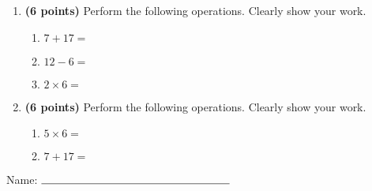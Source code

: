 \documentclass[12pt]{amsart}
\begin{document}
\newpage
\begin{enumerate}
\item {\bf (6 points)} 
 Perform the following operations. Clearly show your work. \begin{enumerate}


\def \a{7}\def \b{17}\def \apb{24}

 
\item $\a + \b = $

\vspace{2cm}
\def \a{12}\def \dif{6}\def \b{6}

 
\item $\a - \b = $

\vspace{2cm}
\def \a{2}\def \b{6}\def \ab{8}

 
\item $\a \times \b = $ 

\vspace{2cm}
\def \vshift{-3}\def \hshift{-4}\def \chang{0}\def \findval{-4}\def \yval{-3}

 
\end{enumerate}


\newpage
\item {\bf (6 points)} 
 Perform the following operations. Clearly show your work. \begin{enumerate}


\def \a{5}\def \b{6}\def \ab{11}

 
\item $\a \times \b = $ 

\vspace{2cm}
\def \a{7}\def \b{17}\def \apb{24}

 
\item $\a + \b = $

\vspace{2cm}
\def \vshift{1}\def \hshift{-4}\def \chang{-2}\def \findval{-6}\def \yval{5}

 
\end{enumerate}


\newpage\end{enumerate}\graphicspath{{/Users/jilan/Downloads/Randomizer/Randomizer/Sample Course/Sample Assessment 2/}}\setcounter{page}{1}


\thispagestyle{fancy}

 
\noindent Name: $\rule{6cm}{0.15mm}$

\vspace{.2cm}
\end{document}
